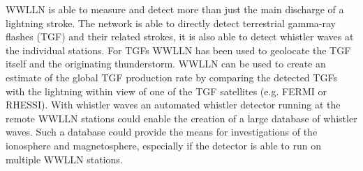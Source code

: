 WWLLN is able to measure and detect more than just the main discharge of a lightning stroke.
The network is able to directly detect terrestrial gamma-ray flashes (TGF) and their related strokes, it is also able to detect whistler waves at the individual stations.
For TGFs WWLLN has been used to geolocate the TGF itself and the originating thunderstorm.
WWLLN can be used to create an estimate of the global TGF production rate by comparing the detected TGFs with the lightning within view of one of the TGF satellites (e.g. FERMI or RHESSI).
With whistler waves an automated whistler detector running at the remote WWLLN stations could enable the creation of a large database of whistler waves.
Such a database could provide the means for investigations of the ionosphere and magnetosphere, especially if the detector is able to run on multiple WWLLN stations.







